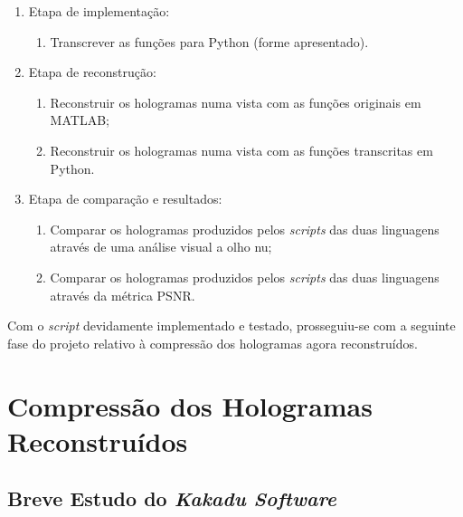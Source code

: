\begin{enumerate}
    \item Etapa de implementação:
    \begin{enumerate}
        \item Transcrever as funções para Python (forme apresentado).
    \end{enumerate}
    
    \item Etapa de reconstrução:
    \begin{enumerate}
        \item Reconstruir os hologramas numa vista com as funções originais em MATLAB;
        \item Reconstruir os hologramas numa vista com as funções transcritas em Python.
    \end{enumerate}

    \item Etapa de comparação e resultados:
    \begin{enumerate}
        \item Comparar os hologramas produzidos pelos \textit{scripts} das duas linguagens através de uma análise visual a olho nu;
        \item Comparar os hologramas produzidos pelos \textit{scripts} das duas linguagens através da métrica \ac{PSNR}.
    \end{enumerate}
\end{enumerate}

Com o \textit{script} devidamente implementado e testado, prosseguiu-se com a seguinte fase do projeto relativo à compressão dos hologramas agora reconstruídos.


\section{Compressão dos Hologramas Reconstruídos}
\label{sec::imp-test:holo-compress}






\subsection{Breve Estudo do \textit{Kakadu Software}}
\label{ssec::imp-test:holo-compress:estudo-kdu}

